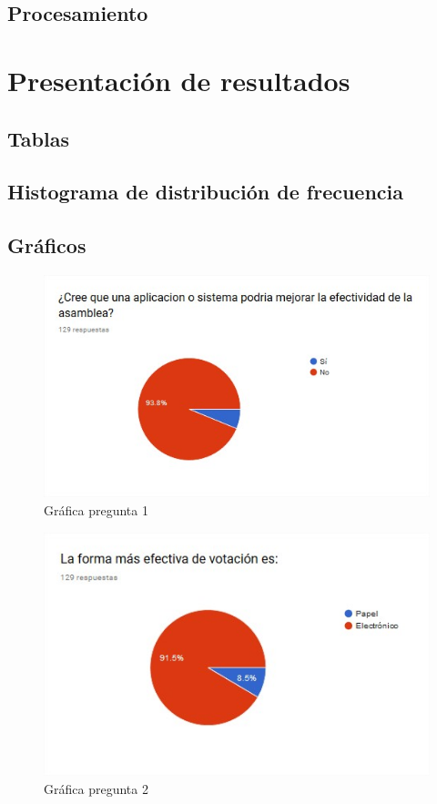 \subsection{Procesamiento}

\section{Presentación de resultados}

\subsection{Tablas}

\subsection{Histograma de distribución de frecuencia}

\subsection{Gráficos}


\begin{figure}[th!]
	\centering
	\includegraphics[width=0.7\linewidth]{desarrollo/resultados/imgs/pregunta-1}
	\caption{Gráfica pregunta 1}
\end{figure}


\begin{figure}[th!]
	\centering
	\includegraphics[width=0.7\linewidth]{desarrollo/resultados/imgs/pregunta-2}
	\caption{Gráfica pregunta 2}
\end{figure}


